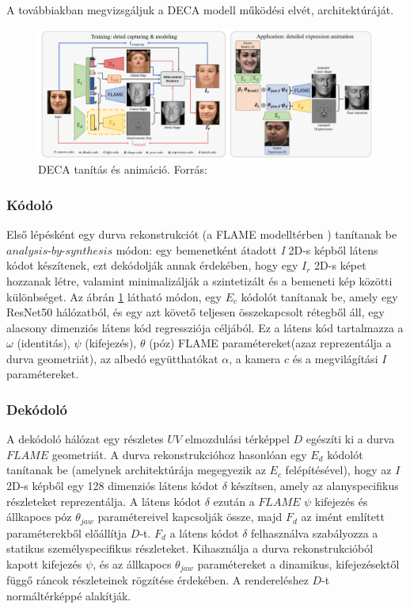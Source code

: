\documentclass[12pt,a4]{article}
\begin{document}
 	A továbbiakban megvizsgáljuk a DECA modell működési elvét, architektúráját.
 	
 	\begin{figure}[h]	
 		\centering
 		\includegraphics[width=1\linewidth]{deca}
 		\caption{ DECA tanítás és animáció.
 			Forrás:\cite{deca}}
        \label{fig:deca}
 	\end{figure}
 	
	 \subsubsection{Kódoló}
	 Első lépésként egy durva rekonstrukciót (a FLAME modelltérben \cite{flame}) tanítanak be $analysis$-$by$-$synthesis$ módon: egy bemenetként átadott \textit{I} 2D-s képből látens kódot készítenek, ezt dekódolják annak érdekében, hogy egy $I_{r}$ 2D-s képet hozzanak létre, valamint minimalizálják a szintetizált és a bemeneti kép közötti különbséget.
	 Az ábrán \ref{fig:deca} látható módon, egy $E_{c}$ kódolót tanítanak be, amely egy ResNet50 \cite{liwen} hálózatból, és egy azt követő teljesen összekapcsolt rétegből áll, egy alacsony dimenziós látens kód regressziója céljából. Ez a látens kód tartalmazza a $\omega$ (identitás), $\psi$ (kifejezés), $\theta$ (póz) FLAME \cite{flame} paramétereket(azaz reprezentálja a durva geometriát), az albedó együtthatókat $\alpha$, a kamera $c$ és a megvilágítási $I$ paramétereket.\\
	 
 \subsubsection{Dekódoló}
 	 
 	A dekódoló hálózat egy részletes $UV$ elmozdulási térképpel $D$ egészíti
 	ki a durva $FLAME$ geometriát. A durva rekonstrukcióhoz hasonlóan
 	egy $E_{d}$ kódolót tanítanak be (amelynek architektúrája megegyezik az $E_{c}$
 	felépítésével), hogy az $I$ 2D-s képből egy 128 dimenziós látens kódot $\delta$
 	készítsen, amely az alanyspecifikus részleteket reprezentálja. A látens kódot $\delta$
 	ezután a $FLAME$ $\psi$ kifejezés és állkapocs póz $\theta_{jaw}$ paramétereivel kapcsolják
 	össze, majd $F_{d}$ az imént említett paraméterekből előállítja $D$-t. $F_{d}$ a látens kódot $\delta$ felhasználva szabályozza a statikus személyspecifikus részleteket. Kihasználja a durva rekonstrukcióból kapott kifejezés $\psi$, és az állkapocs $\theta_{jaw}$ paramétereket a dinamikus, kifejezésektől függő ráncok részleteinek rögzítése érdekében. A rendereléshez $D$-t normáltérképpé alakítják.
 	 
\end{document}
